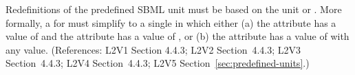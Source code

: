 Redefinitions of the predefined SBML unit  must be based on the unit
 or .  More formally, a \UnitDefinition
for  must simplify to a single \Unit in which either (a) the
 attribute has a value of  and the
 attribute has a value of , or (b) the
 attribute has a value of  with
any  value.  (References: L2V1 Section 4.4.3; L2V2
Section~4.4.3; L2V3 Section~4.4.3; L2V4 Section~4.4.3; L2V5 Section~\ref{sec:predefined-units}.)
